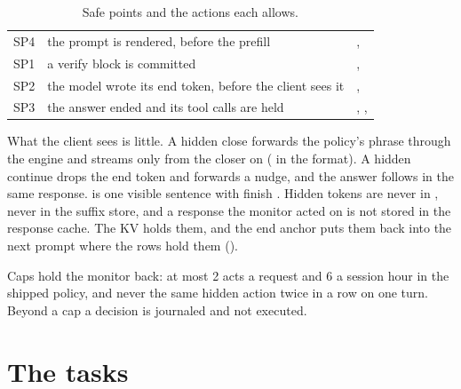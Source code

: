 \begin{table}[htbp]
\centering\small
\caption{Safe points and the actions each allows.}\label{tab:safe-points}
\begin{tabularx}{\linewidth}{@{}L{.12\linewidth}L{.36\linewidth}Y@{}}
\toprule
{} &  &  \\
\midrule
SP4 & the prompt is rendered, before the prefill & ,  \\
SP1 & a verify block is committed & ,  \\
SP2 & the model wrote its end token, before the client sees it & ,  \\
SP3 & the answer ended and its tool calls are held & , ,  \\
\bottomrule
\end{tabularx}
\end{table}

What the client sees is little. A hidden close forwards the policy's phrase through the engine and streams only from the closer on ( in the  format). A hidden continue drops the end token and forwards a nudge, and the answer follows in the same response.  is one visible sentence with finish . Hidden tokens are never in , never in the suffix store, and a response the monitor acted on is not stored in the response cache. The KV holds them, and the end anchor puts them back into the next prompt where the rows hold them ().

Caps hold the monitor back: at most 2 acts a request and 6 a session hour in the shipped policy, and never the same hidden action twice in a row on one turn. Beyond a cap a decision is journaled and not executed.

\section{The tasks}

